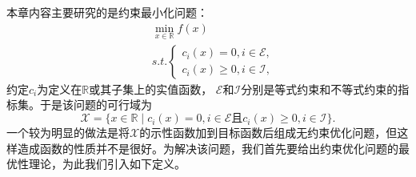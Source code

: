 本章内容主要研究的是约束最小化问题：
\begin{equation}\label{co}
	\begin{split}
		&\min\limits_{x\in\mathbb{R}} f(x)\\\
		&s.t. \begin{cases}
			c_i(x) = 0, i\in \mathcal{E},\\
			c_i(x) \geq 0, i\in \mathcal{I},
		\end{cases}
	\end{split}
\end{equation}
约定$c_i$为定义在$\mathbb{R}$或其子集上的实值函数， $\mathcal{E}$和$\mathcal{I}$分别是等式约束和不等式约束的指标集。于是该问题的可行域为
\begin{equation*}
	\mathcal{X} = \{x\in \mathbb{R}\mid c_i(x)=0, i\in \mathcal{E}\text{且}c_i(x)\geq 0, i\in \mathcal{I}\}.
\end{equation*}
一个较为明显的做法是将$\mathcal{X}$的示性函数加到目标函数后组成无约束优化问题，但这样造成函数的性质并不是很好。为解决该问题，我们首先要给出约束优化问题的最优性理论，为此我们引入如下定义。

